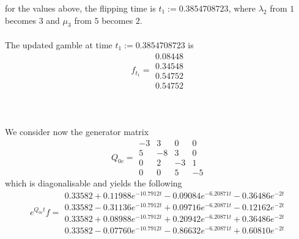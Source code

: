 \documentclass{article}
\begin{document}
for the values above, the flipping time is $t_{1}:= 0.3854708723$, where $\lambda_{2}$ from $1$ becomes $3$ and $\mu_{3}$ from $5$ becomes $2$.\\\\
The updated gamble at time $t_{1}:= 0.3854708723$ is
\begin{equation*} 
 f_{t_1}= 
 \begin{array}{|c|}
  0.08448\\
  0.34548\\
  0.54752\\
  0.54752  
 \end{array}
 \end{equation*}\\\\\\
We consider now the generator matrix 
\begin{equation*} 
 Q_{0c}= 
 \begin{array}{|rrrr|}
  -3 & 3 & 0 & 0 \\
  5 & -8 & 3 & 0 \\
  0 & 2 & -3 & 1 \\
  0 & 0 & 5 & -5 
 \end{array}
 \end{equation*}
which is diagonalisable and yields the following
\begin{equation*} 
 e^{Q_{0c}t}f= 
 \begin{array}{|r|}
  0.33582+0.11988e^{-10.7912t}- 0.09084e^{-6.20871t}- 0.36486e^{-2t}\\
  0.33582-0.31136e^{-10.7912t}+ 0.09716e^{-6.20871t}- 0.12162e^{-2t}\\
  0.33582+ 0.08988e^{-10.7912t}+ 0.20942e^{-6.20871t} + 0.36486e^{-2t}\\
  0.33582-0.07760e^{-10.7912t}- 0.86632e^{-6.20871t}+ 0.60810e^{-2t}  
 \end{array}
 \end{equation*}
\end{document}
